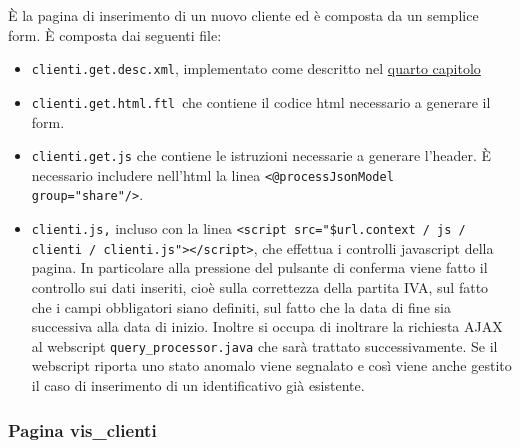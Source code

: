 È la pagina di inserimento di un nuovo cliente ed è composta da un semplice form.
È composta dai seguenti file:
\begin{itemize}
\item \texttt{clienti.get.desc.xml}, implementato come descritto nel \hyperref[cap:architettura]{ quarto  capitolo}
\item\texttt{clienti.get.html.ftl }che contiene il codice html necessario a generare il form.
\item\texttt{clienti.get.js} che contiene le istruzioni necessarie a generare l’header. È necessario includere nell’html la linea \texttt{<@processJsonModel group="share"/>}.
\item \texttt{clienti.js,} incluso con la linea \texttt{<script src="\${url.context} / js / clienti / clienti.js"></script>}, che effettua i controlli javascript della pagina. In particolare alla pressione del pulsante di conferma viene fatto il controllo sui dati inseriti, cioè sulla correttezza della partita IVA, sul fatto che i campi obbligatori siano definiti, sul fatto che la data di fine sia successiva alla data di inizio. Inoltre si occupa di inoltrare la richiesta AJAX al webscript \texttt{query\_processor.java} che sarà trattato successivamente. Se il webscript riporta uno stato anomalo viene segnalato e così viene anche gestito il caso di inserimento di un identificativo già esistente.
\end{itemize}

\subsubsection{Pagina vis\_clienti}

